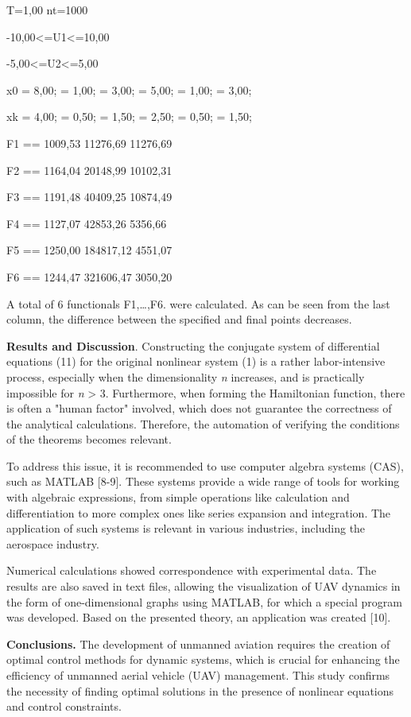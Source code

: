 T=1,00 nt=1000

-10,00\textless=U1\textless=10,00

-5,00\textless=U2\textless=5,00

x0 = 8,00; = 1,00; = 3,00; = 5,00; = 1,00; = 3,00;

xk = 4,00; = 0,50; = 1,50; = 2,50; = 0,50; = 1,50;

F1 == 1009,53 11276,69 11276,69

F2 == 1164,04 20148,99 10102,31

F3 == 1191,48 40409,25 10874,49

F4 == 1127,07 42853,26 5356,66

F5 == 1250,00 184817,12 4551,07

F6 == 1244,47 321606,47 3050,20

A total of 6 functionals F1,\ldots,F6. were calculated. As can be seen
from the last column, the difference between the specified and final
points decreases.

{\bfseries Results and Discussion}. Constructing the conjugate system of
differential equations (11) for the original nonlinear system (1) is a
rather labor-intensive process, especially when the dimensionality
\emph{n} increases, and is practically impossible for \emph{n}
\textgreater{} 3. Furthermore, when forming the Hamiltonian function,
there is often a "human factor" involved, which does not guarantee the
correctness of the analytical calculations. Therefore, the automation of
verifying the conditions of the theorems becomes relevant.

To address this issue, it is recommended to use computer algebra systems
(CAS), such as MATLAB {[}8-9{]}. These systems provide a wide range of
tools for working with algebraic expressions, from simple operations
like calculation and differentiation to more complex ones like series
expansion and integration. The application of such systems is relevant
in various industries, including the aerospace industry.

Numerical calculations showed correspondence with experimental data. The
results are also saved in text files, allowing the visualization of UAV
dynamics in the form of one-dimensional graphs using MATLAB, for which a
special program was developed. Based on the presented theory, an
application was created {[}10{]}.

{\bfseries Conclusions.} The development of unmanned aviation requires the
creation of optimal control methods for dynamic systems, which is
crucial for enhancing the efficiency of unmanned aerial vehicle (UAV)
management. This study confirms the necessity of finding optimal
solutions in the presence of nonlinear equations and control
constraints.

